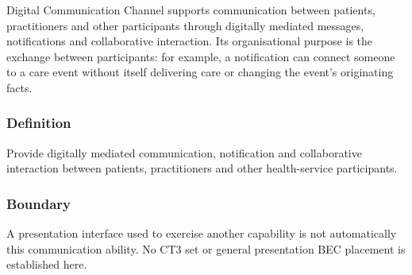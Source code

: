 Digital Communication Channel supports communication between patients, practitioners and other participants through digitally mediated messages, notifications and collaborative interaction. Its organisational purpose is the exchange between participants: for example, a notification can connect someone to a care event without itself delivering care or changing the event's originating facts.

\subsubsection*{Definition}

Provide digitally mediated communication, notification and collaborative interaction between patients, practitioners and other health-service participants.

\subsubsection*{Boundary}

A presentation interface used to exercise another capability is not automatically this communication ability. No CT3 set or general presentation BEC placement is established here.

